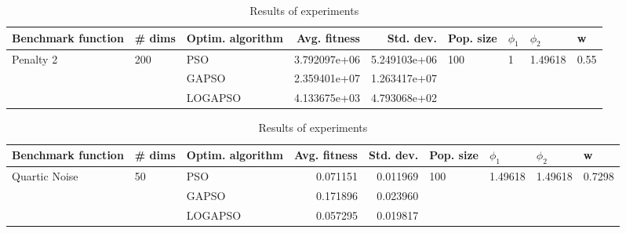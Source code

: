 \documentclass{article}
\begin{document}
\begin{table}
\centering
\caption{Results of experiments}
\begin{tabular}{lllrrllll}
\toprule
        Benchmark function &              \# dims & Optim. algorithm &  Avg. fitness &    Std. dev. &            Pop. size &         $\phi_{1}$ &               $\phi_{2}$ &                     w \\
\midrule
\multirow{3}{*}{Penalty 2} & \multirow{3}{*}{200} &              PSO &  3.792097e+06 & 5.249103e+06 & \multirow{3}{*}{100} & \multirow{3}{*}{1} & \multirow{3}{*}{1.49618} & \multirow{3}{*}{0.55} \\
                           &                      &            GAPSO &  2.359401e+07 & 1.263417e+07 &                      &                    &                          &                       \\
                           &                      &          LOGAPSO &  4.133675e+03 & 4.793068e+02 &                      &                    &                          &                       \\
\bottomrule
\end{tabular}
\end{table}
\begin{table}
\centering
\caption{Results of experiments}
\begin{tabular}{lllrrllll}
\toprule
            Benchmark function &             \# dims & Optim. algorithm &  Avg. fitness &  Std. dev. &            Pop. size &               $\phi_{1}$ &               $\phi_{2}$ &                       w \\
\midrule
\multirow{3}{*}{Quartic Noise} & \multirow{3}{*}{50} &              PSO &      0.071151 &   0.011969 & \multirow{3}{*}{100} & \multirow{3}{*}{1.49618} & \multirow{3}{*}{1.49618} & \multirow{3}{*}{0.7298} \\
                               &                     &            GAPSO &      0.171896 &   0.023960 &                      &                          &                          &                         \\
                               &                     &          LOGAPSO &      0.057295 &   0.019817 &                      &                          &                          &                         \\
\bottomrule
\end{tabular}
\end{table}
\end{document}
